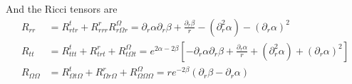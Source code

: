 \documentclass{article}
\begin{document}
	And the Ricci tensors are
	\begin{align*}
		R_{rr} &= R^{t}_{rtr} + R_{rrr}^r R_{r\Omega r}^\Omega = \partial_r \alpha \partial_r \beta+ \frac{\partial_r \beta}{r} - \left( \partial_r^2 \alpha\right) - \left( \partial_r \alpha \right)^2 \\
		R_{tt} &= R^{t}_{ttt} + R^{r}_{trt} + R^{\Omega}_{t\Omega t} = e^{2\alpha - 2 \beta} \left[ - \partial_r \alpha \partial_r \beta+ \frac{\partial_r \alpha}{r} + \left( \partial_r^2 \alpha\right) + \left( \partial_r \alpha \right)^2 \right] \\
		R_{\Omega\Omega} &= R^t_{\Omega t \Omega} + R_{\Omega r \Omega}^r + R_{\Omega\Omega \Omega}^\Omega = re^{-2\beta} \left( \partial_r \beta - \partial_r \alpha\right)
	\end{align*}
\end{document}
